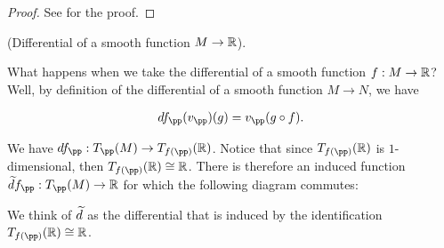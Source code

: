 \begin{proof}
    See \cite{book::SM} for the proof.
\end{proof}

\begin{theorem}
\label{ch::manifolds::thm::differential_smooth_map_M_R}

     (Differential of a smooth function $M \rightarrow \mathbb{R}$).
    
    What happens when we take the differential of a smooth function $f:M \rightarrow \mathbb{R}$? Well, by definition of the differential of a smooth function $M \rightarrow N$, we have
    
    \begin{align*}
        df_\pp(v_\pp)(g) = v_\pp(g \circ f).
    \end{align*}
    
    We have $df_\pp:T_\pp(M) \rightarrow T_{f(\pp)}(\R)$. Notice that since $T_{f(\pp)}(\R)$ is $1$-dimensional, then $T_{f(\pp)}(\R) \cong \R$. There is therefore an induced function $\td f_\pp:T_\pp(M) \rightarrow \R$ for which the following diagram commutes:
    
    \begin{center}
    \end{center}
    
    We think of $\widetilde{d}$ as the differential that is induced by the identification $T_{f(\pp)}(\R) \cong \R$.
    

\end{theorem}
